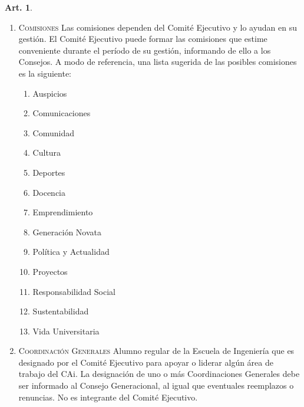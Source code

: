 \documentclass[letterpaper,11pt]{article}
\theoremstyle{definition}%
\newtheorem{art}{Art.} %
\begin{document}
\begin{art}
\begin{enumerate}
		\item \textsc{Comisiones} Las comisiones dependen del Comité Ejecutivo y lo ayudan en su gestión. El Comité Ejecutivo puede formar las comisiones que estime conveniente durante el período de su gestión, informando de ello a los Consejos. A modo de referencia, una lista sugerida de las posibles comisiones es la siguiente:
		      \begin{enumerate}
			      \item Auspicios
			      \item Comunicaciones
			      \item Comunidad
			      \item Cultura
			      \item Deportes
			      \item Docencia
			      \item Emprendimiento
			      \item Generación Novata
			      \item Política y Actualidad
			      \item Proyectos
			      \item Responsabilidad Social
			      \item Sustentabilidad
			      \item Vida Universitaria
		      \end{enumerate}

		\item \textsc{Coordinación Generales} Alumno regular de la Escuela de Ingeniería que es designado por el Comité Ejecutivo para apoyar o liderar algún área de trabajo del CAi. La designación de uno o más Coordinaciones Generales debe ser informado al Consejo Generacional, al igual que eventuales reemplazos o renuncias. No es integrante del Comité Ejecutivo.
	\end{enumerate}
\end{art}
\end{document}

